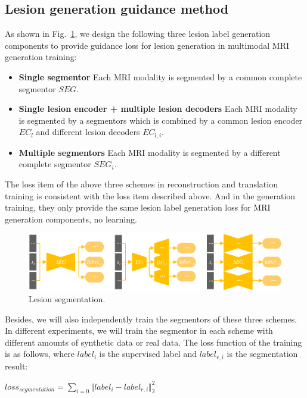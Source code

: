 \documentclass[letterpaper]{article} %
\begin{document}
\subsection{Lesion generation guidance method}
\label{label gen methods}
As shown in Fig.~\ref{segmentation}, we design the following three lesion label generation components to provide guidance loss for lesion generation in multimodal MRI generation training:
\begin{itemize}
	\item \textbf{Single segmentor} 
	Each MRI modality  is segmented by a common complete segmentor $SEG$.
	\item \textbf{Single lesion encoder + multiple lesion decoders} 
	Each MRI modality  is segmented by a segmentors which is combined by a common lesion encoder $EC_{l}$ and different lesion decoders $EC_{l,i}$. 
	\item \textbf{Multiple segmentors} 
	Each MRI modality  is segmented by a different complete segmentor $SEG_i$.
\end{itemize}
The loss item of the above three schemes in reconstruction and translation training is consistent with the loss item described above. And in the generation training, they only provide the same lesion label generation loss for MRI generation components, no learning.

\begin{figure}
	\centering
	\includegraphics[width=0.8\columnwidth]{figures/segmentation}
	\caption{Lesion segmentation.}
	\label{segmentation}
\end{figure}
Besides, we will also independently train the segmentors of these three schemes. In different experiments, we will train the segmentor in each scheme with different amounts of synthetic data or real data. The loss function of the training is as follows, where $label_i$ is the supervised label and $label_{r,i}$ is the segmentation result:
\begin{center}
	$loss_{segmentation}=\sum\limits_{i=0}\Vert{label_i-label_{r,i}}\Vert_{2}^{2}$
\end{center}
\end{document}
